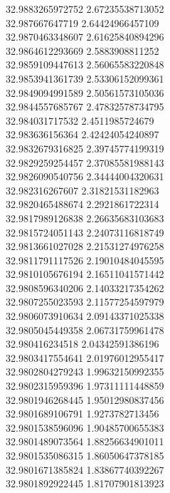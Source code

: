 {32.9883265972752	2.67235538713052\\
32.987667647719	2.64424966457109\\
32.9870463348607	2.61625840894296\\
32.9864612293669	2.5883908811252\\
32.9859109447613	2.56065583220848\\
32.9853941361739	2.53306152099361\\
32.9849094991589	2.50561573105036\\
32.9844557685767	2.47832578734795\\
32.984031717532	2.4511985724679\\
32.983636156364	2.42424054240897\\
32.9832679316825	2.39745774199319\\
32.9829259254457	2.37085581988143\\
32.9826090540756	2.34444004320631\\
32.982316267607	2.31821531182963\\
32.9820465488674	2.2921861722314\\
32.9817989126838	2.26635683103683\\
32.9815724051143	2.24073116818749\\
32.9813661027028	2.21531274976258\\
32.9811791117526	2.19010484045595\\
32.9810105676194	2.16511041571442\\
32.9808596340206	2.14033217354262\\
32.9807255023593	2.11577254597979\\
32.9806073910634	2.09143371025338\\
32.9805045449358	2.06731759961478\\
32.980416234518	2.04342591386196\\
32.9803417554641	2.01976012955417\\
32.9802804279243	1.99632150992355\\
32.9802315959396	1.97311111448859\\
32.9801946268445	1.95012980837456\\
32.9801689106791	1.9273782713456\\
32.9801538596096	1.90485700655383\\
32.9801489073564	1.88256634901011\\
32.9801535086315	1.86050647378185\\
32.9801671385824	1.83867740392267\\
32.9801892922445	1.81707901813923\\
}
